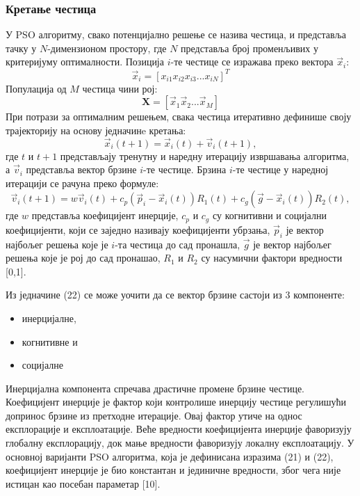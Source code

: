\documentclass[12pt]{article}
\begin{document}
\subsubsection{Кретање честица}
У PSO алгоритму, свако потенцијално решење се назива честица, и представља тачку у $N$-димензионом простору, где $N$ представља број променљивих у критеријуму оптималности. Позиција $i$-те честице се изражава преко вектора $\vec x_i$:
\begin{equation}
    \vec x_i = [x_{i1} x_{i2} x_{i3}... x_{iN}]^T
\end{equation}
Популација од $M$ честица чини рој:
\begin{equation}
    \textbf{X} = [\vec x_1 \vec x_2 ... \vec x_M]
\end{equation}
При потрази за оптималним решењем, свака честица итеративно дефинише своју трајекторију на основу једначинe кретања:
\begin{equation}
    \vec x_i(t+1) = \vec x_i(t) +\vec v_i(t+1),
\end{equation}
где $t$ и $t+1$ представљају тренутну и наредну итерацију извршавања алгоритма, а $\vec v_i$ представља вектор брзине $i$-те честице. Брзина $i$-те честице у наредној итерацији се рачуна преко формуле:
\begin{equation}
    \vec v_i(t+1) = w\vec v_i(t) + c_p(\vec p_i- \vec x_i(t))R_1(t) + c_g(\vec g- \vec x_i(t))R_2(t),
\end{equation}
где $w$ представља коефицијент инерције, $c_p$ и $c_g$ су когнитивни и социјални коефицијенти, који се заједно називају коефицијенти убрзања, $\vec p_i$ је вектор најбољег решења које је $i$-та честица до сад пронашла, $\vec{g}$ је вектор најбољег решења које је рој до сад пронашао,  $R_1$ и $R_2$ су насумични фактори вредности [0,1].

Из једначине (22) се може уочити да се вектор брзине састоји из 3 компоненте:
\begin{itemize}
    \item инерцијалне,
    \item когнитивне и
    \item социјалне
\end{itemize}
Инерцијална компонента спречава драстичне промене брзине честице. Коефицијент инерције је фактор који контролише инерцију честице регулишући допринос брзине из претходне итерације. Овај фактор утиче на однос експлорације и експлоатације. Веће вредности коефицијента инерције фаворизују глобалну експлорацију, док мање вредности фаворизују локалну експлоатацију. У основној варијанти PSO алгоритма, која је дефинисана изразима (21) и (22), коефицијент инерције је био константан и јединичне вредности, због чега није истицан као посебан параметар [10].
\end{document}
